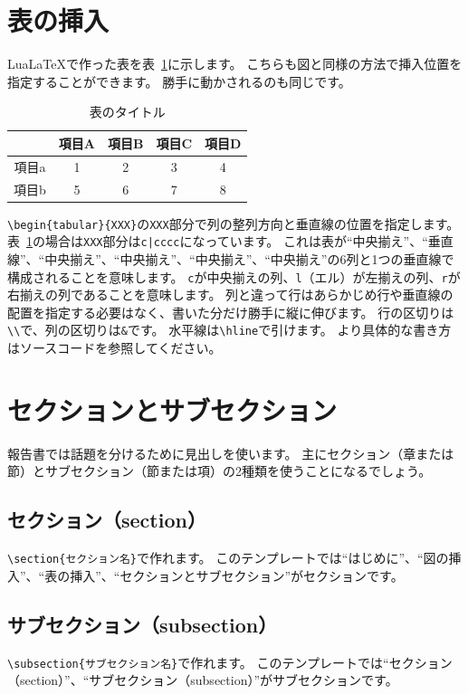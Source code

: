 \documentclass[10pt,a4j,twocolumn]{ltjsarticle}
\begin{document}
\section{表の挿入}

Lua\LaTeX で作った表を表~\ref{表のラベル}に示します。
こちらも図と同様の方法で挿入位置を指定することができます。
勝手に動かされるのも同じです。
\begin{table}
  \centering
  \caption{表のタイトル}
  \label{表のラベル}
  \begin{tabular}{c|cccc}
    \hline
          & 項目A & 項目B & 項目C & 項目D \\
    \hline \hline
    項目a & 1     & 2     & 3     & 4     \\
    項目b & 5     & 6     & 7     & 8     \\
    \hline
  \end{tabular}
\end{table}

\verb|\begin{tabular}{XXX}|の\verb|XXX|部分で列の整列方向と垂直線の位置を指定します。
表~\ref{表のラベル}の場合は\verb|XXX|部分は\verb=c|cccc=になっています。
これは表が``中央揃え''、``垂直線''、``中央揃え''、``中央揃え''、``中央揃え''、``中央揃え''の6列と1つの垂直線で構成されることを意味します。
\verb|c|が中央揃えの列、\verb|l|（エル）が左揃えの列、\verb|r|が右揃えの列であることを意味します。
列と違って行はあらかじめ行や垂直線の配置を指定する必要はなく、書いた分だけ勝手に縦に伸びます。
行の区切りは\verb|\\|で、列の区切りは\verb|&|です。
水平線は\verb|\hline|で引けます。
より具体的な書き方はソースコードを参照してください。

\section{セクションとサブセクション}

報告書では話題を分けるために見出しを使います。
主にセクション（章または節）とサブセクション（節または項）の2種類を使うことになるでしょう。

\subsection{セクション（section）}

\verb|\section{セクション名}|で作れます。
このテンプレートでは``はじめに''、``図の挿入''、``表の挿入''、``セクションとサブセクション''がセクションです。

\subsection{サブセクション（subsection）}

\verb|\subsection{サブセクション名}|で作れます。
このテンプレートでは``セクション（section）''、``サブセクション（subsection）''がサブセクションです。
\end{document}
